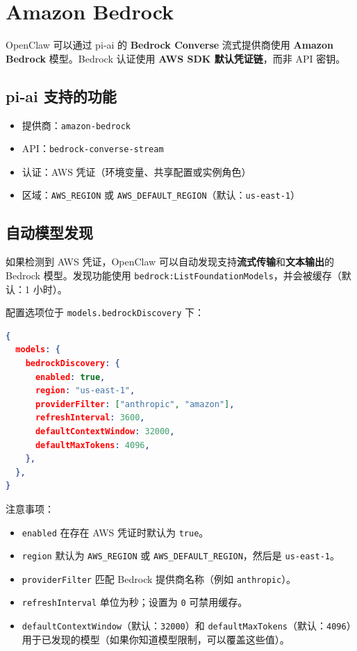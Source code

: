 \clearpage

\section{Amazon Bedrock}


OpenClaw 可以通过 pi‑ai 的 \textbf{Bedrock Converse} 流式提供商使用 \textbf{Amazon Bedrock} 模型。Bedrock 认证使用 \textbf{AWS SDK 默认凭证链}，而非 API 密钥。

\subsection{pi‑ai 支持的功能}


\begin{itemize}
  \item 提供商：\texttt{amazon-bedrock}
  \item API：\texttt{bedrock-converse-stream}
  \item 认证：AWS 凭证（环境变量、共享配置或实例角色）
  \item 区域：\texttt{AWS\_REGION} 或 \texttt{AWS\_DEFAULT\_REGION}（默认：\texttt{us-east-1}）
\end{itemize}


\subsection{自动模型发现}


如果检测到 AWS 凭证，OpenClaw 可以自动发现支持\textbf{流式传输}和\textbf{文本输出}的 Bedrock 模型。发现功能使用 \texttt{bedrock:ListFoundationModels}，并会被缓存（默认：1 小时）。

配置选项位于 \texttt{models.bedrockDiscovery} 下：

\begin{lstlisting}[language=json]
{
  models: {
    bedrockDiscovery: {
      enabled: true,
      region: "us-east-1",
      providerFilter: ["anthropic", "amazon"],
      refreshInterval: 3600,
      defaultContextWindow: 32000,
      defaultMaxTokens: 4096,
    },
  },
}
\end{lstlisting}


注意事项：

\begin{itemize}
  \item \texttt{enabled} 在存在 AWS 凭证时默认为 \texttt{true}。
  \item \texttt{region} 默认为 \texttt{AWS\_REGION} 或 \texttt{AWS\_DEFAULT\_REGION}，然后是 \texttt{us-east-1}。
  \item \texttt{providerFilter} 匹配 Bedrock 提供商名称（例如 \texttt{anthropic}）。
  \item \texttt{refreshInterval} 单位为秒；设置为 \texttt{0} 可禁用缓存。
  \item \texttt{defaultContextWindow}（默认：\texttt{32000}）和 \texttt{defaultMaxTokens}（默认：\texttt{4096}）用于已发现的模型（如果你知道模型限制，可以覆盖这些值）。
\end{itemize}


